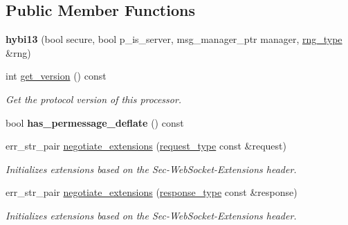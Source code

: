 \subsection*{Public Member Functions}
\begin{DoxyCompactItemize}
\item 
\mbox{\label{classwebsocketpp_1_1processor_1_1hybi13_af07830f45e2733bd75db70fe951416cf}} 
{\bfseries hybi13} (bool secure, bool p\+\_\+is\+\_\+server, msg\+\_\+manager\+\_\+ptr manager, \mbox{\hyperlink{classwebsocketpp_1_1random_1_1none_1_1int__generator}{rng\+\_\+type}} \&rng)
\item 
\mbox{\label{classwebsocketpp_1_1processor_1_1hybi13_afe89fa6418643711130ce3417451738b}} 
int \mbox{\hyperlink{classwebsocketpp_1_1processor_1_1hybi13_afe89fa6418643711130ce3417451738b}{get\+\_\+version}} () const
\begin{DoxyCompactList}\small\item\em Get the protocol version of this processor. \end{DoxyCompactList}\item 
\mbox{\label{classwebsocketpp_1_1processor_1_1hybi13_af6ad6f16537a2d6c389c56f6cfaf3c57}} 
bool {\bfseries has\+\_\+permessage\+\_\+deflate} () const
\item 
err\+\_\+str\+\_\+pair \mbox{\hyperlink{classwebsocketpp_1_1processor_1_1hybi13_aee995e6a4a29a800ce3b031885814ed1}{negotiate\+\_\+extensions}} (\mbox{\hyperlink{classwebsocketpp_1_1http_1_1parser_1_1request}{request\+\_\+type}} const \&request)
\begin{DoxyCompactList}\small\item\em Initializes extensions based on the Sec-\/\+Web\+Socket-\/\+Extensions header. \end{DoxyCompactList}\item 
err\+\_\+str\+\_\+pair \mbox{\hyperlink{classwebsocketpp_1_1processor_1_1hybi13_a5b01c6303142aa151cf9bf1fe9ccb6e3}{negotiate\+\_\+extensions}} (\mbox{\hyperlink{classwebsocketpp_1_1http_1_1parser_1_1response}{response\+\_\+type}} const \&response)
\begin{DoxyCompactList}\small\item\em Initializes extensions based on the Sec-\/\+Web\+Socket-\/\+Extensions header. \end{DoxyCompactList}\item 

\end{DoxyCompactItemize}
